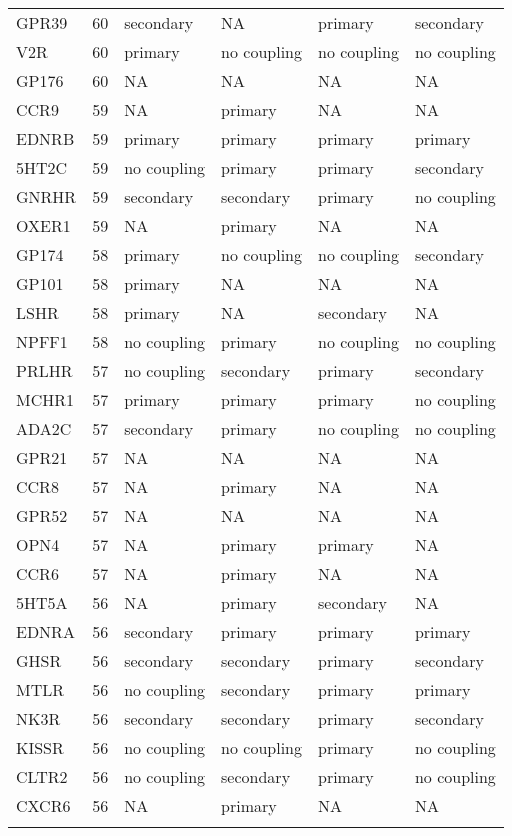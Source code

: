 \begin{longtable}{lrllll}
GPR39 & 60 & secondary & NA & primary & secondary\\
V2R & 60 & primary & no coupling & no coupling & no coupling\\
GP176 & 60 & NA & NA & NA & NA\\
\addlinespace
CCR9 & 59 & NA & primary & NA & NA\\
EDNRB & 59 & primary & primary & primary & primary\\
5HT2C & 59 & no coupling & primary & primary & secondary\\
GNRHR & 59 & secondary & secondary & primary & no coupling\\
OXER1 & 59 & NA & primary & NA & NA\\
\addlinespace
GP174 & 58 & primary & no coupling & no coupling & secondary\\
GP101 & 58 & primary & NA & NA & NA\\
LSHR & 58 & primary & NA & secondary & NA\\
NPFF1 & 58 & no coupling & primary & no coupling & no coupling\\
PRLHR & 57 & no coupling & secondary & primary & secondary\\
\addlinespace
MCHR1 & 57 & primary & primary & primary & no coupling\\
ADA2C & 57 & secondary & primary & no coupling & no coupling\\
GPR21 & 57 & NA & NA & NA & NA\\
CCR8 & 57 & NA & primary & NA & NA\\
GPR52 & 57 & NA & NA & NA & NA\\
\addlinespace
OPN4 & 57 & NA & primary & primary & NA\\
CCR6 & 57 & NA & primary & NA & NA\\
5HT5A & 56 & NA & primary & secondary & NA\\
EDNRA & 56 & secondary & primary & primary & primary\\
GHSR & 56 & secondary & secondary & primary & secondary\\
\addlinespace
MTLR & 56 & no coupling & secondary & primary & primary\\
NK3R & 56 & secondary & secondary & primary & secondary\\
KISSR & 56 & no coupling & no coupling & primary & no coupling\\
CLTR2 & 56 & no coupling & secondary & primary & no coupling\\
CXCR6 & 56 & NA & primary & NA & NA\\
\addlinespace

\end{longtable}
